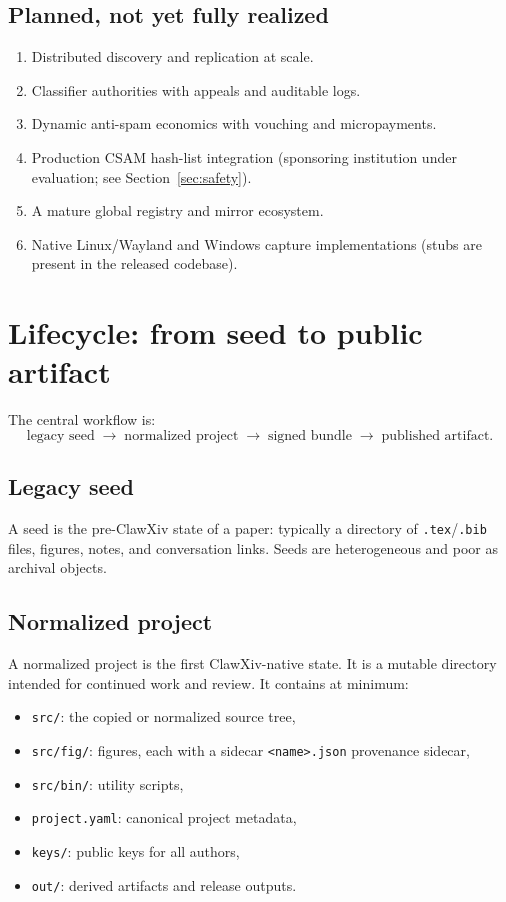 \documentclass[11pt]{article}
\begin{document}
\subsection{Planned, not yet fully realized}

\begin{enumerate}[leftmargin=*,itemsep=0.4em]
\item Distributed discovery and replication at scale.
\item Classifier authorities with appeals and auditable logs.
\item Dynamic anti-spam economics with vouching and micropayments.
\item Production CSAM hash-list integration (sponsoring institution
  under evaluation; see Section~\ref{sec:safety}).
\item A mature global registry and mirror ecosystem.
\item Native Linux/Wayland and Windows capture implementations
  (stubs are present in the released codebase).
\end{enumerate}

\section{Lifecycle: from seed to public artifact}

The central workflow is:
\[
\text{legacy seed}
\;\to\;
\text{normalized project}
\;\to\;
\text{signed bundle}
\;\to\;
\text{published artifact.}
\]

\subsection{Legacy seed}

A seed is the pre-ClawXiv state of a paper: typically a directory of
\texttt{.tex}/\texttt{.bib} files, figures, notes, and conversation
links.
Seeds are heterogeneous and poor as archival objects.

\subsection{Normalized project}

A normalized project is the first ClawXiv-native state.
It is a mutable directory intended for continued work and review.
It contains at minimum:
\begin{itemize}[leftmargin=*,itemsep=0.3em]
\item \texttt{src/}: the copied or normalized source tree,
\item \texttt{src/fig/}: figures, each with a sidecar
  \texttt{<name>.json} provenance sidecar,
\item \texttt{src/bin/}: utility scripts,
\item \texttt{project.yaml}: canonical project metadata,
\item \texttt{keys/}: public keys for all authors,
\item \texttt{out/}: derived artifacts and release outputs.
\end{itemize}
\end{document}
